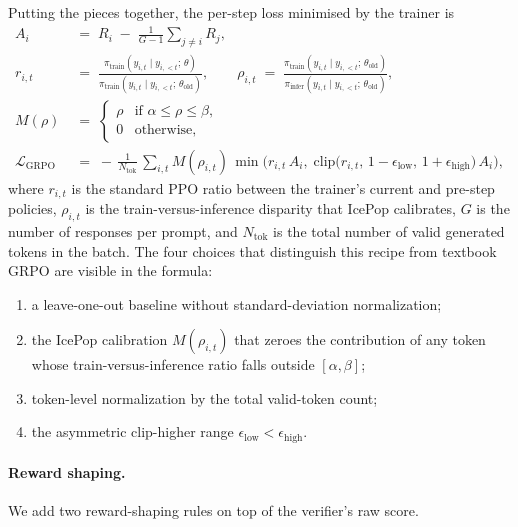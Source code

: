 \documentclass[11pt,a4paper]{article}
\begin{document}
Putting the pieces together, the per-step loss minimised by the trainer
is
\begin{equation*}
\begin{aligned}
A_i \;&=\; R_i \;-\; \frac{1}{G-1}\sum_{j \neq i} R_j, \\[2pt]
r_{i,t} \;&=\; \frac{\pi_\text{train}(y_{i,t} \mid y_{i,<t};\, \theta)}
                    {\pi_\text{train}(y_{i,t} \mid y_{i,<t};\, \theta_\text{old})},
\qquad
\rho_{i,t} \;=\; \frac{\pi_\text{train}(y_{i,t} \mid y_{i,<t};\, \theta_\text{old})}
                       {\pi_\text{infer}(y_{i,t} \mid y_{i,<t};\, \theta_\text{old})}, \\[4pt]
M(\rho) \;&=\;
\begin{cases}
\rho & \text{if } \alpha \le \rho \le \beta, \\
0 & \text{otherwise,}
\end{cases} \\[4pt]
\mathcal{L}_\text{GRPO}
\;&=\;
-\,\frac{1}{N_\text{tok}}\,
\sum_{i,t}
M(\rho_{i,t})\,
\min\!\Big(
r_{i,t}\, A_i,\;
\mathrm{clip}\!\big(r_{i,t},\, 1 - \epsilon_\text{low},\, 1 + \epsilon_\text{high}\big)\, A_i
\Big),
\end{aligned}
\end{equation*}
where $r_{i,t}$ is the standard PPO ratio between the trainer's current
and pre-step policies, $\rho_{i,t}$ is the train-versus-inference
disparity that IcePop calibrates, $G$ is the number of responses per
prompt, and $N_\text{tok}$ is the total number of valid generated tokens
in the batch. The four choices that distinguish this recipe from
textbook GRPO are visible in the formula:
\begin{enumerate}
  \item a leave-one-out baseline without standard-deviation
    normalization;
  \item the IcePop calibration $M(\rho_{i,t})$ that zeroes the
    contribution of any token whose train-versus-inference ratio falls
    outside $[\alpha, \beta]$;
  \item token-level normalization by the total valid-token count;
  \item the asymmetric clip-higher range
    $\epsilon_\text{low} < \epsilon_\text{high}$.
\end{enumerate}

\paragraph{Reward shaping.}
We add two reward-shaping rules on top of the verifier's raw score.
\end{document}

